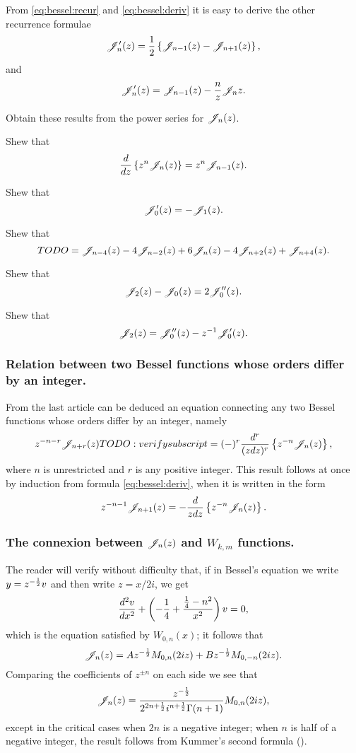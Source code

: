 \documentclass{book}
\begin{document}
From \eqref{eq:bessel:recur} and \eqref{eq:bessel:deriv} it is easy to
derive the other recurrence formulae
\begin{equation}
  \mathscr{J}'_{n}(z) = \frac{1}{2} \left\{  \mathscr{J}_{n-1}(z) - \mathscr{J}_{n+1}(z)   \right\},
\end{equation}
and
\begin{equation}
  \mathscr{J}'_{n}(z) = \mathscr{J}_{n-1}(z) - \frac{n}{z} \mathscr{J}_n{z}.
\end{equation}
\begin{wandwexample}
  Obtain these results from the power series for $\mathscr{J}_n(z)$.
\end{wandwexample}
\begin{wandwexample}
  Shew that 
  $$
  \frac{d}{dz} \left\{  z^n \mathscr{J}_n(z)  \right\} = z^n \mathscr{J}_{n-1}(z).
  $$
\end{wandwexample}
\begin{wandwexample}
  Shew that
  $$
  \mathscr{J}'_0(z) = -\mathscr{J}_1(z).
  $$
\end{wandwexample}
\begin{wandwexample}
  Shew that
  $$
  TODO = \mathscr{J}_{n-4}(z) - 4 \mathscr{J}_{n-2}(z) + 6 \mathscr{J}_n(z) - 4 \mathscr{J}_{n+2}(z) + \mathscr{J}_{n+4}(z).
  $$
\end{wandwexample}
\begin{wandwexample}
  Shew that
  $$
  \mathscr{J}_2(z) - \mathscr{J}_0(z) = 2 \mathscr{J}''_0(z).
  $$
\end{wandwexample}
\begin{wandwexample}
  Shew that
  $$
  \mathscr{J}_2(z) = \mathscr{J}''_0(z) - z^{-1} \mathscr{J}'_0(z).
  $$
\end{wandwexample}

\subsubsection{Relation between two Bessel functions whose orders
  differ by an integer.}
From the last article can be deduced an equation connecting any two
Bessel functions whose orders differ by an integer, namely
$$
z^{-n-r} \mathscr{J}_{n+r}(z) TODO: verify subscript
=
(-)^r
\frac{d^r}{ (z dz)^r }
\left\{  z^{-n} \mathscr{J}_n(z)   \right\},
$$
where $n$ is unrestricted and $r$ is any positive integer. This result
follows at once by induction from formula \eqref{eq:bessel:deriv},
when it is written in the form
$$
z^{-n-1} \mathscr{J}_{n+1}(z) 
=
- \frac{d}{z dz}
\left\{  z^{-n} \mathscr{J}_n(z)   \right\}.
$$
\subsubsection{The connexion between $\mathscr{J}_n(z)$ and $W_{k,m}$
  functions.}
The reader will verify without difficulty that, if in Bessel's
equation we write $y = z^{-\frac{1}{2}} v$ and then write $z = x/2i$, we get
$$
\frac{d^2 v}{dx^2}
+
\left(  -\frac{1}{4} + \frac{\frac{1}{4} - n^2}{x^2}   \right) v
=
0,
$$
which is the equation satisfied by $W_{0,n}(x)$; it follows that
$$
\mathscr{J}_n(z) = A z^{-\frac{1}{2}} M_{0,n}(2iz) + B z^{-\frac{1}{2}} M_{0,-n}(2iz).
$$
Comparing the coefficients of $z^{\pm n}$ on each side we see that
$$
\mathscr{J}_n(z) = \frac{z^{-\frac{1}{2}}}{2^{2n+\frac{1}{2}} i^{n+\frac{1}{2}} \Gamma(n+1)} M_{0,n}(2iz),
$$
%
%
except in the critical cases when $2n$ is a negative integer; 
when $n$ is half of a negative integer, the result follows from
Kummer's second formula ().
\end{document}
